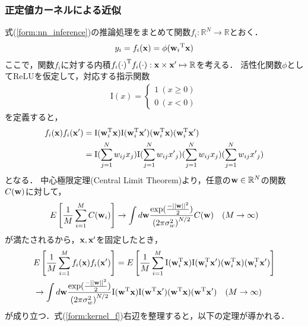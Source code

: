 \documentclass[11pt,a4j]{article}
\begin{document}
      \subsubsection{正定値カーネルによる近似}
        式(\ref{form:nn_inference})の推論処理をまとめて関数$f_i:\mathbb{R}^{N} \to \mathbb{R}$とおく．
        \begin{align}
          y_i = f_i({\bf x}) = \phi( {{\bf w}_i}^{\mathrm{T}} {\bf x} )
        \end{align}
        ここで，関数$f_i$に対する内積${f_i(\cdot)}^{\mathrm{T}} f_i(\cdot): {\bf x} \times {\bf x}' \mapsto \mathbb{R}$を考える．
        活性化関数$\phi$としてReLUを仮定して，対応する指示関数
        \begin{align}
          {\mathrm{I}}(x) = 
          \begin{cases}
            1 ~ (x \geq 0) \\
            0 ~ (x < 0)
          \end{cases}
        \end{align}
        を定義すると，
        \begin{align}
          {f_i({\bf x})} f_i({\bf x}') 
          &= {\mathrm{I}}( {\bf w}_{i}^{\mathrm{T}} {\bf x} ) {\mathrm{I}}( {\bf w}_{i}^{\mathrm{T}} {\bf x}' ) 
          ( {\bf w}_{i}^{\mathrm{T}} {\bf x} ) ( {\bf w}_{i}^{\mathrm{T}} {\bf x}' ) \\
          &= {\mathrm{I}}(\sum_{j=1}^{N} {w}_{ij} {x}_j) {\mathrm{I}}(\sum_{j=1}^{N} {w}_{ij} {x'}_j)
          ( \sum_{j=1}^{N} {w}_{ij} {x}_j ) ( \sum_{j=1}^{N} {w}_{ij} {x'}_j )          
        \end{align}
        となる．
        中心極限定理(Central Limit Theorem)より，任意の${\bf w} \in \mathbb{R}^{N}$の関数$C({\bf w})$に対して，
        \begin{align}
          E\left[ \frac{1}{M} \sum_{i=1}^{M} C({\bf w}_i) \right] \to
          \int d{\bf w} \frac{\exp (\frac{- {|| {\bf w} ||}^2}{2})}{{(2 \pi \sigma_w^2 )}^{N / 2}}
          C({\bf w}) ~~~ (M \to \infty)
        \end{align}
        が満たされるから，${\bf x}, {\bf x}'$を固定したとき，
        \begin{align}
          &E\left[ \frac{1}{M} \sum_{i=1}^{M} {f_i ({\bf x})} f_i ({\bf x}') \right] 
          = E\left[ \frac{1}{M} \sum_{i=1}^{M} {\mathrm{I}}( {\bf w}_{i}^{\mathrm{T}} {\bf x} ) {\mathrm{I}}( {\bf w}_{i}^{\mathrm{T}} {\bf x}' ) 
          ( {\bf w}_{i}^{\mathrm{T}} {\bf x} ) ( {\bf w}_{i}^{\mathrm{T}} {\bf x}' ) \right] \nonumber \\
          &\to \int d{\bf w} \frac{\exp (\frac{- {|| {\bf w} ||}^2}{2})}{{(2 \pi \sigma_w^2 )}^{N / 2}}
          {\mathrm{I}}( {\bf w}^{\mathrm{T}} {\bf x} ) {\mathrm{I}}( {\bf w}^{\mathrm{T}} {\bf x}' ) 
          ( {\bf w}^{\mathrm{T}} {\bf x} ) ( {\bf w}^{\mathrm{T}} {\bf x}' ) ~~~ (M \to \infty) \label{form:kernel_f} 
        \end{align}
        が成り立つ．式(\ref{form:kernel_f})右辺を整理すると，以下の定理が導かれる．
\end{document}
